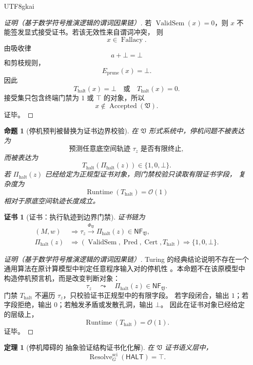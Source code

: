 \documentclass[12pt]{article}
\newtheorem{theorem}{定理}[section]
\newtheorem{proposition}{命题}[section]
\newtheorem{Certificate}{证书}[section]
\newcommand{\Vsys}{\mathfrak V}
\newcommand{\NF}{\mathsf{NF}}
\DeclareMathOperator{\Pred}{Pred}
\DeclareMathOperator{\Cert}{Cert}
\DeclareMathOperator{\Accepted}{Accepted}
\DeclareMathOperator{\Fallacy}{Fallacy}
\DeclareMathOperator{\Resolve}{Resolve}
\DeclareMathOperator{\ValidSem}{ValidSem}
\DeclareMathOperator{\Runtime}{Runtime}
\begin{document}
\begin{CJK*}{UTF8}{gkai}
\begin{proof}[证明（基于数学符号推演逻辑的谓词因果链）]
若 \(\ValidSem(x)=0\)，则 \(x\) 不能签发显式接受证书。若该无效性来自谓词冲突，
则
\[
  x\in\Fallacy.
\]
由吸收律
\[
  a+\bot=\bot
\]
和剪枝规则，
\[
  E_{\mathrm{prune}}(x)=\bot.
\]
因此
\[
  T_{\mathrm{halt}}(x)=\bot
  \quad\text{或}\quad
  T_{\mathrm{halt}}(x)=0.
\]
接受集只包含终端门禁为 \(1\) 或 \(\top\) 的对象，所以
\[
  x\notin\Accepted(\Vsys).
\]
证毕。
\end{proof}

\begin{proposition}[停机预判被替换为证书边界校验]
\label{prop:tex59-halting-boundary}
在 \(\Vsys\) 形式系统中，停机问题不被表达为
\[
  \text{预测任意底空间轨迹 }\tau_z\text{ 是否有限终止},
\]
而被表达为
\[
  T_{\mathrm{halt}}(\Pi_{\mathrm{halt}}(z))\in\{1,0,\bot\}.
\]
若 \(\Pi_{\mathrm{halt}}(z)\) 已经给定为正规型证书对象，则门禁校验只读取有限证书字段，
复杂度为
\[
  \Runtime(T_{\mathrm{halt}})=\mathcal O(1)
\]
相对于原底空间轨迹长度成立。
\end{proposition}

\begin{Certificate}[证书：执行轨迹到边界门禁]
\label{cert:tex59-halting-boundary}
证书链为
\[
  \begin{aligned}
  (M,w)
  &\Longrightarrow
  \tau_z
  \xrightarrow{\Phi_{\Vsys}}
  \Pi_{\mathrm{halt}}(z)\in\NF_{\Vsys},\\
  \Pi_{\mathrm{halt}}(z)
  &\Longrightarrow
  \left(
    \ValidSem,\Pred,\Cert,T_{\mathrm{halt}}
  \right)
  \Longrightarrow
  \{1,0,\bot\}.
  \end{aligned}
\]
\end{Certificate}

\begin{proof}[证明（基于数学符号推演逻辑的谓词因果链）]
Turing 的经典结论说明不存在一个通用算法在原计算模型中判定任意程序输入对的停机性
\cite{Turing1936Computable}。本命题不在该原模型中构造停机预言机，而是改变判断对象：
\[
  \tau_z
  \quad\leadsto\quad
  \Pi_{\mathrm{halt}}(z)\in\NF_{\Vsys}.
\]
门禁 \(T_{\mathrm{halt}}\) 不遍历 \(\tau_z\)，只校验证书正规型中的有限字段。
若字段闭合，输出 \(1\)；若字段拒绝，输出 \(0\)；若触发矛盾或发散孔洞，输出 \(\bot\)。
因此在证书对象已经给定的层级上，
\[
  \Runtime(T_{\mathrm{halt}})=\mathcal O(1).
\]
证毕。
\end{proof}

\begin{theorem}[停机障碍的 抽象验证结构证书化化解]
\label{thm:tex59-halting-resolution}
在 \(\Vsys\) 证书语义层中，
\[
  \Resolve_G^{\mathrm{sci}}(\mathsf{HALT})=\top.
\]
\end{theorem}


\end{CJK*}
\end{document}
